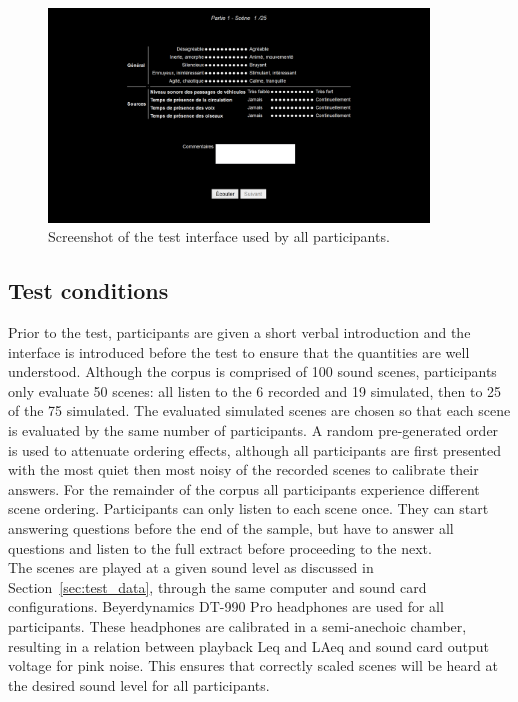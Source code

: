 \documentclass[11pt,a4paper]{article}
\begin{document}
\begin{figure}
    \centering
    \includegraphics[width=0.9\textwidth]{figures/interface.png}
    \caption{Screenshot of the test interface used by all participants.}\label{fig:interface}
\end{figure}

\subsection{Test conditions}

Prior to the test, participants are given a short verbal introduction and the interface is introduced before the test to ensure that the quantities are well understood. Although the corpus is comprised of 100 sound scenes, participants only evaluate 50 scenes: all listen to the 6 recorded and 19 simulated, then to 25 of the 75 simulated. The evaluated simulated scenes are chosen so that each scene is evaluated by the same number of participants. A random pre-generated order is used to attenuate ordering effects, although all participants are first presented with the most quiet then most noisy of the recorded scenes to calibrate their answers. For the remainder of the corpus all participants experience different scene ordering. Participants can only listen to each scene once. They can start answering questions before the end of the sample, but have to answer all questions and listen to the full extract before proceeding to the next.\\

The scenes are played at a given sound level as discussed in Section~\ref{sec:test_data}, through the same computer and sound card configurations. Beyerdynamics DT-990 Pro headphones are used for all participants. These headphones are calibrated in a semi-anechoic chamber, resulting in a relation between playback Leq and LAeq and sound card output voltage for pink noise. This ensures that correctly scaled scenes will be heard at the desired sound level for all participants.\\
\end{document}
